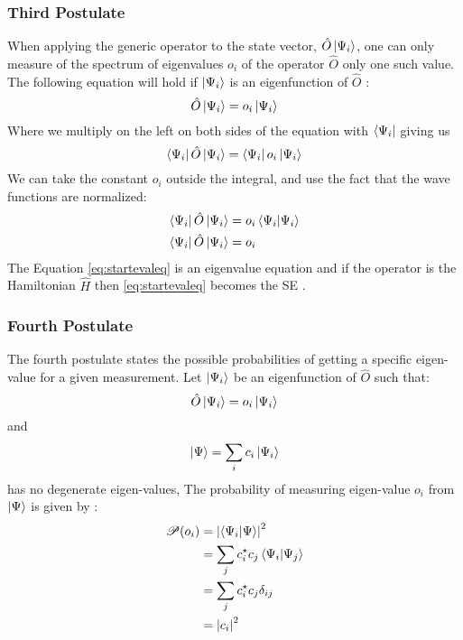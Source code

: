 \documentclass[../master_thesis.tex]{subfiles}
\begin{document}
\subsubsection{Third Postulate}
When applying the generic operator to the state vector, $\hat{O}\ket{\Psi_i}$,
one can only measure of the spectrum of eigenvalues $o_i$ of the operator $\hat{O}$
only one such value. The following equation will hold if $\ket{\Psi_i}$ is an
eigenfunction of $\hat{O}$
\cite{Cohen:1973, Atkins:2014}:
\begin{equation}
  \hat{O}\ket{\Psi_i} = o_i\ket{\Psi_i}\label{eq:startevaleq}
\end{equation}
Where we multiply on the left on both sides of the equation with $\bra{\Psi_i}$
giving us
\begin{equation}
  \bra{\Psi_i}\hat{O}\ket{\Psi_i} = \bra{\Psi_i}o_i\ket{\Psi_i}
\end{equation}
We can take the constant $o_i$ outside the integral, and
use the fact that the wave functions are normalized:
\begin{align}
  \begin{split}
    \bra{\Psi_i}\hat{O}\ket{\Psi_i} &= o_i\braket{\Psi_i|\Psi_i}\\
    \bra{\Psi_i}\hat{O}\ket{\Psi_i} &= o_i \label{eq:endevaleq}
  \end{split}
\end{align}
The Equation \ref{eq:startevaleq} is an eigenvalue equation and if the operator is
the Hamiltonian $\hat{H}$ then \ref{eq:startevaleq} becomes the \ac{SE} \cite{Cramer:2004}.

\subsubsection{Fourth Postulate}
The fourth postulate states the possible probabilities of getting a specific
eigen-value for a given measurement.
Let $\ket{\Psi_i}$ be an eigenfunction of $\hat{O}$ such that:
\begin{equation}
  \hat{O}\ket{\Psi_i} = o_i\ket{\Psi_i}
\end{equation}
and
\begin{equation}
  \ket{\Psi} = \sum_i c_i \ket{\Psi_i} \label{eq:lincomb}
\end{equation}
has no degenerate eigen-values,
The probability of measuring eigen-value $o_i$ from $\ket{\Psi}$ is given by
\cite{Cohen:1973}:
\begin{align} \label{eq:post4}
  \begin{split}
    \mathscr{P}(o_i) &= \abs{\braket{\Psi_i|\Psi}}^2\\
                     &= \sum_{j}c_i^\star c_j\braket{\Psi_i|\Psi_j}\\
                     &= \sum_{j}c_i^\star c_j\delta_{ij}\\
                     &= \abs{c_i}^2
  \end{split}
\end{align}
\end{document}
